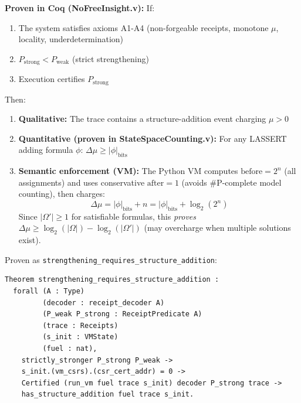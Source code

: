 \begin{theorem}
\textbf{Proven in Coq (NoFreeInsight.v):}
If:
\begin{enumerate}
    \item The system satisfies axioms A1-A4 (non-forgeable receipts, monotone $\mu$, locality, underdetermination)
    \item $P_{\text{strong}} < P_{\text{weak}}$ (strict strengthening)
    \item Execution certifies $P_{\text{strong}}$
\end{enumerate}
Then:
\begin{enumerate}
    \item \textbf{Qualitative:} The trace contains a structure-addition event charging $\mu > 0$
    \item \textbf{Quantitative (proven in StateSpaceCounting.v):} For any LASSERT adding formula $\phi$: $\Delta\mu \ge |\phi|_{\text{bits}}$
    \item \textbf{Semantic enforcement (VM):} The Python VM computes $\text{before} = 2^{n}$ (all assignments) and uses conservative $\text{after} = 1$ (avoids \#P-complete model counting), then charges:
    \[
    \Delta\mu = |\phi|_{\text{bits}} + n = |\phi|_{\text{bits}} + \log_2(2^n)
    \]
    Since $|\Omega'| \ge 1$ for satisfiable formulas, this \emph{proves} $\Delta\mu \ge \log_2(|\Omega|) - \log_2(|\Omega'|)$ (may overcharge when multiple solutions exist).
\end{enumerate}
\end{theorem}

Proven as \texttt{strengthening\_requires\_structure\_addition}:
\begin{lstlisting}
Theorem strengthening_requires_structure_addition :
  forall (A : Type)
         (decoder : receipt_decoder A)
         (P_weak P_strong : ReceiptPredicate A)
         (trace : Receipts)
         (s_init : VMState)
         (fuel : nat),
    strictly_stronger P_strong P_weak ->
    s_init.(vm_csrs).(csr_cert_addr) = 0 ->
    Certified (run_vm fuel trace s_init) decoder P_strong trace ->
    has_structure_addition fuel trace s_init.
\end{lstlisting}

